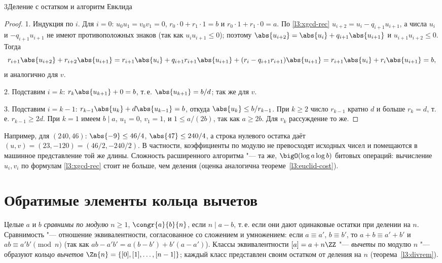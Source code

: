 \begin{lecture}{3}{Деление с остатком и алгоритм Евклида}
\begin{proof}
1. Индукция по $i$. Для $i = 0$: $u_0 u_1 = v_0 v_1 = 0$, $r_0 \cdot 0 + r_1 \cdot 1 = b$ и
$r_0 \cdot 1 + r_1 \cdot 0 = a$. По \eqref{l3:xgcd-rec} $u_{i+2} = u_i - q_{i+1} u_{i+1}$, а числа $u_i$
и $-q_{i+1}u_{i+1}$ не имеют противоположных знаков (так как $u_i u_{i+1} \le 0$); поэтому
$\abs{u_{i+2}} = \abs{u_i} + q_{i+1}\abs{u_{i+1}}$ и $u_{i+1} u_{i+2} \le 0$. Тогда
\[
  r_{i+1}\abs{u_{i+2}} + r_{i+2}\abs{u_{i+1}}
  = r_{i+1}\abs{u_i} + q_{i+1} r_{i+1} \abs{u_{i+1}} + (r_i - q_{i+1} r_{i+1}) \abs{u_{i+1}}
  = r_{i+1}\abs{u_i} + r_i\abs{u_{i+1}} = b,
\]
и аналогично для $v$.

2. Подставим $i = k$: $r_k \abs{u_{k+1}} + 0 = b$, т.\,е. $\abs{u_{k+1}} = b/d$; так же для $v$.

3. Подставим $i = k - 1$: $r_{k-1}\abs{u_k} + d\abs{u_{k-1}} = b$, откуда $\abs{u_k} \le b / r_{k-1}$.
При $k \ge 2$ число $r_{k-1}$ кратно $d$ и больше $r_k = d$, т.\,е. $r_{k-1} \ge 2d$. При $k = 1$
имеем $b \mid a$, $u_1 = 0$, $v_1 = 1$, и $1 \le a/(2b)$, так как $a \ge 2b$. Для $v_k$ рассуждение
то же.
\end{proof}

Например, для $(240, 46)$: $\abs{-9} \le 46/4$, $\abs{47} \le 240/4$, а строка нулевого остатка
даёт $(u, v) = (23, -120) = (46/2, -240/2)$. В частности, коэффициенты по модулю не превосходят
исходных чисел и помещаются в машинное представление той же длины. Сложность расширенного
алгоритма "--- та же, $\bigO(\log a \log b)$ битовых операций: вычисление $u_i, v_i$ по формулам
\eqref{l3:xgcd-rec} стоит не больше, чем деления (оценка аналогична теореме~\ref{l3:euclid-cost}).




\section{Обратимые элементы кольца вычетов}

Целые $a$ и $b$ \emph{сравнимы по модулю} $n \ge 1$, $\congr{a}{b}{n}$, если $n \mid a - b$, т.\,е.
если они дают одинаковые остатки при делении на $n$. Сравнимость "--- отношение эквивалентности,
согласованное со сложением и умножением: если $a \equiv a'$, $b \equiv b'$, то
$a + b \equiv a' + b'$ и $ab \equiv a'b' \pmod n$ (так как $ab - a'b' = a(b - b') + b'(a - a')$).
Классы эквивалентности $[a] = a + n\ZZ$ "--- \emph{вычеты} по модулю $n$ "--- образуют
\emph{кольцо вычетов} $\Zn{n} = \{[0], [1], \dots, [n - 1]\}$; каждый класс представлен своим
остатком от деления на $n$ (теорема~\ref{l3:divrem}).


\end{lecture}
